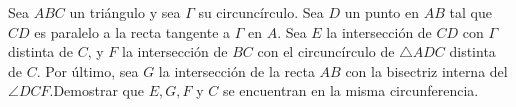 Sea $ABC$ un triángulo y sea $\Gamma$ su circuncírculo. Sea $D$ un punto en $AB$ tal que $CD$ es paralelo a la recta tangente a $\Gamma$ en $A$. Sea $E$ la intersección de $CD$ con $\Gamma$ distinta de $C$, y $F$ la intersección de $BC$ con el circuncírculo de $\bigtriangleup ADC$ distinta de $C$. Por último, sea $G$ la intersección de la recta $AB$ con la bisectriz interna del $\angle DCF$.Demostrar que $E, G, F$ y $C$ se encuentran en la misma circunferencia.

